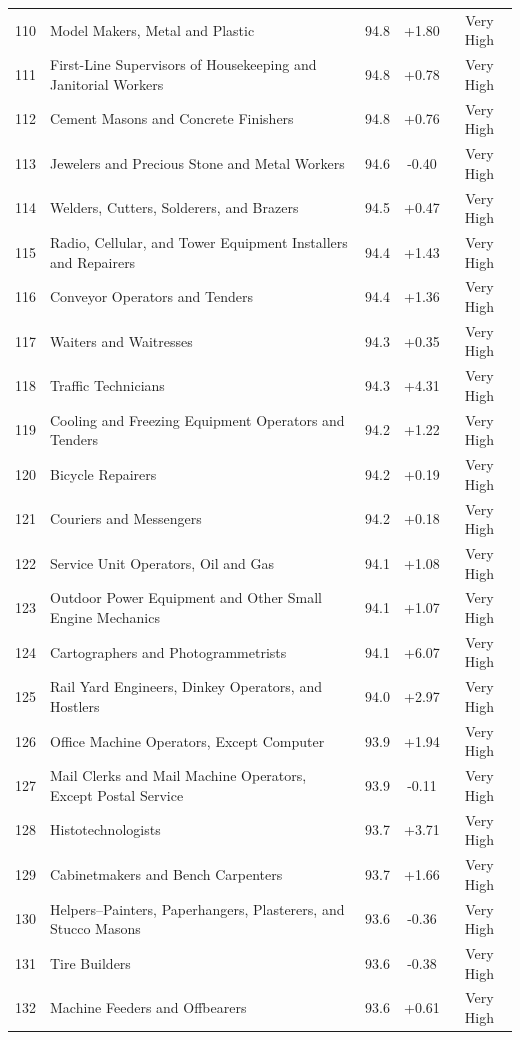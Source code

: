 {\begin{longtable}{rp{7cm}ccc}
110 & Model Makers, Metal and Plastic & 94.8 & +1.80 & Very High \\
111 & First-Line Supervisors of Housekeeping and Janitorial Workers & 94.8 & +0.78 & Very High \\
112 & Cement Masons and Concrete Finishers & 94.8 & +0.76 & Very High \\
113 & Jewelers and Precious Stone and Metal Workers & 94.6 & -0.40 & Very High \\
114 & Welders, Cutters, Solderers, and Brazers & 94.5 & +0.47 & Very High \\
115 & Radio, Cellular, and Tower Equipment Installers and Repairers & 94.4 & +1.43 & Very High \\
116 & Conveyor Operators and Tenders & 94.4 & +1.36 & Very High \\
117 & Waiters and Waitresses & 94.3 & +0.35 & Very High \\
118 & Traffic Technicians & 94.3 & +4.31 & Very High \\
119 & Cooling and Freezing Equipment Operators and Tenders & 94.2 & +1.22 & Very High \\
120 & Bicycle Repairers & 94.2 & +0.19 & Very High \\
121 & Couriers and Messengers & 94.2 & +0.18 & Very High \\
122 & Service Unit Operators, Oil and Gas & 94.1 & +1.08 & Very High \\
123 & Outdoor Power Equipment and Other Small Engine Mechanics & 94.1 & +1.07 & Very High \\
124 & Cartographers and Photogrammetrists & 94.1 & +6.07 & Very High \\
125 & Rail Yard Engineers, Dinkey Operators, and Hostlers & 94.0 & +2.97 & Very High \\
126 & Office Machine Operators, Except Computer & 93.9 & +1.94 & Very High \\
127 & Mail Clerks and Mail Machine Operators, Except Postal Service & 93.9 & -0.11 & Very High \\
128 & Histotechnologists & 93.7 & +3.71 & Very High \\
129 & Cabinetmakers and Bench Carpenters & 93.7 & +1.66 & Very High \\
130 & Helpers--Painters, Paperhangers, Plasterers, and Stucco Masons & 93.6 & -0.36 & Very High \\
131 & Tire Builders & 93.6 & -0.38 & Very High \\
132 & Machine Feeders and Offbearers & 93.6 & +0.61 & Very High \\

\end{longtable}}
